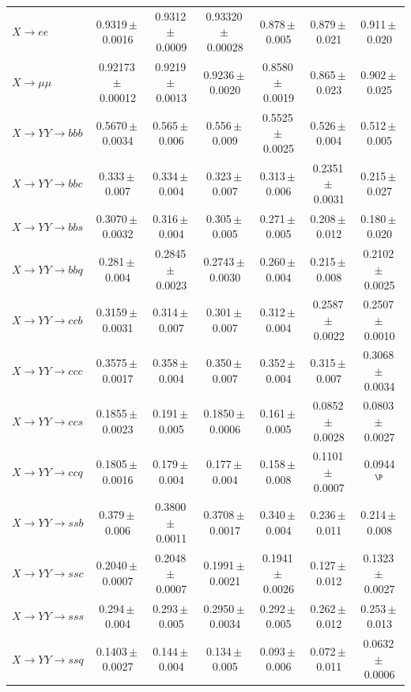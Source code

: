 \begin{landscape}
{\begin{longtable}{@{\extracolsep{\fill}}lcccccc@{}}
\midrule
$X\to ee$ & 0.9319\,$\pm$\,0.0016 & 0.9312\,$\pm$\,0.0009 & 0.93320\,$\pm$\,0.00028 & 0.878\,$\pm$\,0.005 & 0.879\,$\pm$\,0.021 & 0.911\,$\pm$\,0.020 \\
$X\to \mu\mu$ & 0.92173\,$\pm$\,0.00012 & 0.9219\,$\pm$\,0.0013 & 0.9236\,$\pm$\,0.0020 & 0.8580\,$\pm$\,0.0019 & 0.865\,$\pm$\,0.023 & 0.902\,$\pm$\,0.025 \\
\midrule
$X\to YY\to bbb$ & 0.5670\,$\pm$\,0.0034 & 0.565\,$\pm$\,0.006 & 0.556\,$\pm$\,0.009 & 0.5525\,$\pm$\,0.0025 & 0.526\,$\pm$\,0.004 & 0.512\,$\pm$\,0.005 \\
$X\to YY\to bbc$ & 0.333\,$\pm$\,0.007 & 0.334\,$\pm$\,0.004 & 0.323\,$\pm$\,0.007 & 0.313\,$\pm$\,0.006 & 0.2351\,$\pm$\,0.0031 & 0.215\,$\pm$\,0.027 \\
$X\to YY\to bbs$ & 0.3070\,$\pm$\,0.0032 & 0.316\,$\pm$\,0.004 & 0.305\,$\pm$\,0.005 & 0.271\,$\pm$\,0.005 & 0.208\,$\pm$\,0.012 & 0.180\,$\pm$\,0.020 \\
$X\to YY\to bbq$ & 0.281\,$\pm$\,0.004 & 0.2845\,$\pm$\,0.0023 & 0.2743\,$\pm$\,0.0030 & 0.260\,$\pm$\,0.004 & 0.215\,$\pm$\,0.008 & 0.2102\,$\pm$\,0.0025 \\
$X\to YY\to ccb$ & 0.3159\,$\pm$\,0.0031 & 0.314\,$\pm$\,0.007 & 0.301\,$\pm$\,0.007 & 0.312\,$\pm$\,0.004 & 0.2587\,$\pm$\,0.0022 & 0.2507\,$\pm$\,0.0010 \\
$X\to YY\to ccc$ & 0.3575\,$\pm$\,0.0017 & 0.358\,$\pm$\,0.004 & 0.350\,$\pm$\,0.007 & 0.352\,$\pm$\,0.004 & 0.315\,$\pm$\,0.007 & 0.3068\,$\pm$\,0.0034 \\
$X\to YY\to ccs$ & 0.1855\,$\pm$\,0.0023 & 0.191\,$\pm$\,0.005 & 0.1850\,$\pm$\,0.0006 & 0.161\,$\pm$\,0.005 & 0.0852\,$\pm$\,0.0028 & 0.0803\,$\pm$\,0.0027 \\
$X\to YY\to ccq$ & 0.1805\,$\pm$\,0.0016 & 0.179\,$\pm$\,0.004 & 0.177\,$\pm$\,0.004 & 0.158\,$\pm$\,0.008 & 0.1101\,$\pm$\,0.0007 & 0.0944$^{\P}$ \\
$X\to YY\to ssb$ & 0.379\,$\pm$\,0.006 & 0.3800\,$\pm$\,0.0011 & 0.3708\,$\pm$\,0.0017 & 0.340\,$\pm$\,0.004 & 0.236\,$\pm$\,0.011 & 0.214\,$\pm$\,0.008 \\
$X\to YY\to ssc$ & 0.2040\,$\pm$\,0.0007 & 0.2048\,$\pm$\,0.0007 & 0.1991\,$\pm$\,0.0021 & 0.1941\,$\pm$\,0.0026 & 0.127\,$\pm$\,0.012 & 0.1323\,$\pm$\,0.0027 \\
$X\to YY\to sss$ & 0.294\,$\pm$\,0.004 & 0.293\,$\pm$\,0.005 & 0.2950\,$\pm$\,0.0034 & 0.292\,$\pm$\,0.005 & 0.262\,$\pm$\,0.012 & 0.253\,$\pm$\,0.013 \\
$X\to YY\to ssq$ & 0.1403\,$\pm$\,0.0027 & 0.144\,$\pm$\,0.004 & 0.134\,$\pm$\,0.005 & 0.093\,$\pm$\,0.006 & 0.072\,$\pm$\,0.011 & 0.0632\,$\pm$\,0.0006 \\

\end{longtable}}
\end{landscape}
